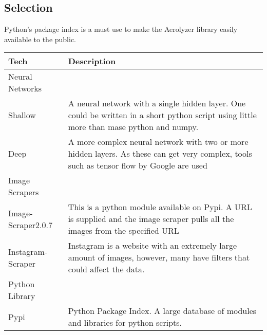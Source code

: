 \documentclass[onecolumn, draftclsnofoot,10pt, compsoc]{IEEEtran}
\begin{document}
\begin{singlespace}
\subsection{Selection}
Python's package index is a must use to make the Aerolyzer library easily available to the public. 


\begin{table}[h!]
\centering
 \begin{tabular}{||p{6cm}  p{11cm}||} 
 \hline
 Tech & Description\\ [0.5ex] 
 \hline\hline
 Neural Networks&\\
 \hline
 Shallow & A neural network with a single hidden layer. One could be written in a short python script using little more than mase python and numpy.\\
 
 Deep & A more complex neural network with two or more hidden layers. As these can get very complex, tools such as tensor flow by Google are used\\
 \hline
 Image Scrapers&\\
 \hline
 Image-Scraper2.0.7 & This is a python module available on Pypi. A URL is supplied and the image scraper pulls all the images from the specified URL \\
 Instagram-Scraper & Instagram is a website with an extremely large amount of images, however, many have filters that could affect the data. \\
 \hline
 Python Library&\\
 \hline
 Pypi & Python Package Index. A large database of modules and libraries for python scripts.  \\ [1ex] 
 \hline
 \end{tabular}
\end{table}

	\nocite{*}
	
	

\end{singlespace}
\end{document}
